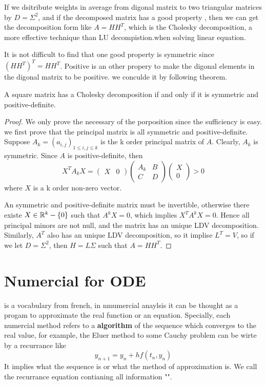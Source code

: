 \documentclass[en,hazy,black,pc,12pt]{elegantnote}
\begin{document}
If we dsitribute weights in average from digonal matrix to two triangular matrices by \(D=\Sigma^2\), and if the decomposed matrix has a good property , then we can get the decomposition form like \(A = HH^T\), which is the Cholesky decomposition, a more effective technique than LU decompistion.when solving linear equation.

It is not difficult to find that one good property is symmetric since \((HH^T)^T=HH^T\). Positive is an other propery to make the digonal elements in the digonal matrix to be positive. we conculde it by following theorem.

\begin{theorem} A square matrix has a Cholesky decomposition if and only if  it is symmetric and positive-definite.

    \begin{proof}
        We only prove the necessary of the porposition since the sufficiency is easy. we first prove that the principal matrix is all symmetric and positive-definite. Suppose \(A_k = (a_{i,j})_{1 \leq i,j \leq k}\) is the k order principal matrix of \(A\). Clearly, \(A_k\) is symmetric. Since \(A\) is positive-definite, then 
        \[ X^TA_kX = \begin{pmatrix}
            X & 0
        \end{pmatrix}
        \begin{pmatrix}
            A_k & B \\
            C & D
        \end{pmatrix}
        \begin{pmatrix}
            X\\
            0
        \end{pmatrix} > 0\]
        where \(X\) is a k order non-zero vector.

        An symmetric and positive-definite matrix must be invertible, otherwise there existe \(X \in \mathbb{R}^k-\{0\}\) such that \(A^k X = 0\), which implies \(X^TA^kX = 0\). Hence all principal minors are not null, and the matrix has an unique LDV decomposition. Similarly, \(A^T\) also has an unique LDV decomposition, so it implise \(L^T = V\), so if we let \(D = \Sigma^2\), then \(H = L \Sigma\) such that \(A  = HH^T\).
    \end{proof}
\end{theorem}

\section{Numercial \sch for ODE}
\Sch is a vocabulary from french, in nmumercial anaylsis it can be thought as a progam to approximate the real function or an equation. Specially, each numercial method refers to a \textbf{algorithm} of the sequence which converges to the real value, for example, the Eluer method to some Cauchy problem  can be wirte by a recurrance like
\[ y_{n+1} = y_n + hf(t_n, y_n)\]
It implies what the sequence is or what the method of approximation is. We call the recurrance equation contianing all information "\sch ".
\end{document}
